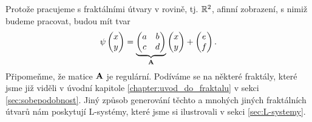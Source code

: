Protože pracujeme s fraktálními útvary v rovině, tj. $\mathbb{R}^2$, afinní zobrazení, s nimiž budeme pracovat, budou mít tvar
\begin{equation}\label{eq:afinita-v-R2}
    \psi\left(\begin{matrix}
        x\\
        y
    \end{matrix}\right)=\underbrace{\left(\begin{matrix}
        a & b\\
        c & d
    \end{matrix}\right)}_{\mathbf{A}}\left(\begin{matrix}
        x\\
        y
    \end{matrix}\right)+\left(\begin{matrix}
        e\\
        f
    \end{matrix}\right).
\end{equation}
Připomeňme, že matice $\mathbf{A}$ je regulární. Podíváme se na některé fraktály, které jsme již viděli v úvodní kapitole \ref{chapter:uvod_do_fraktalu} v sekci \ref{sec:sobepodobnost}. Jiný způsob generování těchto a mnohých jiných fraktálních útvarů nám poskytují L-systémy, které jsme si ilustrovali v sekci \ref{sec:L-systemy}.

